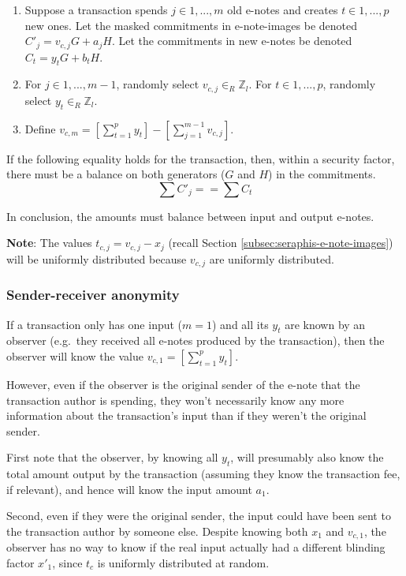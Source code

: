 \begin{enumerate}
    \item Suppose a transaction spends $j \in 1,...,m$ old e-notes and creates $t \in 1,...,p$ new ones. Let the masked commitments in e-note-images be denoted $C'_j = v_{c,j} G + a_j H$. Let the commitments in new e-notes be denoted $C_t = y_t G + b_t H$.

    \item For $j \in 1,...,m-1$, randomly select $v_{c,j} \in_R \mathbb{Z}_l$. For $t \in 1,...,p$, randomly select $y_t \in_R \mathbb{Z}_l$.

    \item Define $v_{c,m} = [\sum^{p}_{t=1} y_t] - [\sum^{m-1}_{j=1} v_{c,j}]$.
\end{enumerate}

If the following equality holds for the transaction, then, within a security factor, there must be a balance on both generators ($G$ and $H$) in the commitments.\vspace{.115cm}
\[\sum C'_j == \sum C_t\]

In conclusion, the amounts must balance between input and output e-notes.

\textbf{Note}: The values $t_{c,j} = v_{c,j} - x_j$ (recall Section \ref{subsec:seraphis-e-note-images}) will be uniformly distributed because $v_{c,j}$ are uniformly distributed.

\subsubsection{Sender-receiver anonymity}
\label{subsubsec:confidential-transactions-sender-receiver-anonymity}

If a transaction only has one input ($m = 1$) and all its $y_t$ are known by an observer (e.g.\ they received all e-notes produced by the transaction), then the observer will know the value $v_{c,1} = [\sum^{p}_{t=1} y_t]$.

However, even if the observer is the original sender of the e-note that the transaction author is spending, they won't necessarily know any more information about the transaction's input than if they weren't the original sender.

First note that the observer, by knowing all $y_t$, will presumably also know the total amount output by the transaction (assuming they know the transaction fee, if relevant), and hence will know the input amount $a_1$.

Second, even if they were the original sender, the input could have been sent to the transaction author by someone else. Despite knowing both $x_1$ and $v_{c,1}$, the observer has no way to know if the real input actually had a different blinding factor $x'_1$, since $t_c$ is uniformly distributed at random.

